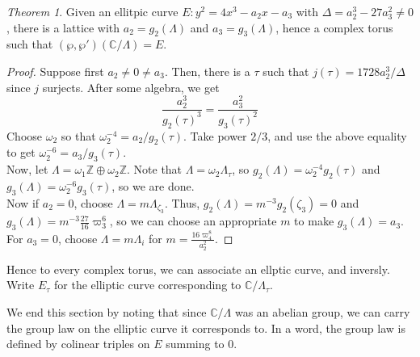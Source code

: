 \documentclass[11pt]{article}
\theoremstyle{plain}
\theoremstyle{definition}
\theoremstyle{example}
\theoremstyle{remark}
\theoremstyle{lemma}
\theoremstyle{proposition}
\theoremstyle{Problem}
\theoremstyle{Solution}
\theoremstyle{theorem}
\newtheorem{theorem}{Theorem}[section]
\theoremstyle{corollary}
\begin{document}
\begin{theorem}
Given an ellitpic curve $E : y^2 = 4x^3-a_2x-a_3$ with $\Delta = a_2^3-27a_3^2\neq 0$, there is a lattice with $a_2 = g_2(\Lambda)$ and $a_3=g_3(\Lambda)$, hence a complex torus such that $(\wp, \wp')(\mathbb{C}/\Lambda) = E$.
\end{theorem}
\begin{proof}
Suppose first $a_2\neq0\neq a_3$. Then, there is a $\tau$ such that $j(\tau) = 1728a_2^3/\Delta$ since $j$ surjects. After some algebra, we get
$$\frac{a_2^3}{g_2(\tau)^3} = \frac{a_3^2}{g_3(\tau)^2}$$
Choose $\omega_2$ so that $\omega_2^{-4}=a_2/g_2(\tau)$. Take power $2/3$, and use the above equality to get $\omega_2^{-6} = a_3/g_3(\tau)$.\\
Now, let $\Lambda = \omega_1\mathbb{Z} \oplus \omega_2\mathbb{Z}$. Note that $\Lambda = \omega_2\Lambda_\tau$, so $g_2(\Lambda) = \omega_2^{-4}g_2(\tau)$ and $g_3(\Lambda) = \omega_2^{-6}g_3(\tau)$, so we are done.\\
Now if $a_2=0$, choose $\Lambda=m\Lambda_{\zeta_3}$. Thus, $g_2(\Lambda) = m^{-3}g_2(\zeta_3) = 0$ and $g_3(\Lambda) = m^{-3}\frac{27}{16}\varpi_3^6$, so we can choose an appropriate $m$ to make $g_3(\Lambda) = a_3$.\\
For $a_3=0$, choose $\Lambda=m\Lambda_{i}$ for $m = \frac{16\varpi_4^8}{a_2^2}$.
\end{proof}
Hence to every complex torus, we can associate an ellptic curve, and inversly. Write $E_\tau$ for the elliptic curve corresponding to $\mathbb{C}/\Lambda_\tau$.

We end this section by noting that since $\mathbb{C}/\Lambda$ was an abelian group, we can carry the group law on the elliptic curve it corresponds to. In a word, the group law is defined by colinear triples on $E$ summing to 0.
\end{document}
